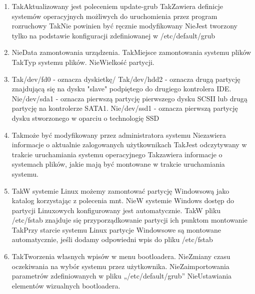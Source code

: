 \begin{enumerate}
	\item {}
	{Tak}{Aktualizowany jest poleceniem update-grub}
	{Tak}{Zawiera definicje systemów operacyjnych możliwych do uruchomienia przez program rozruchowy}
	{Tak}{Nie powinien być ręcznie modyfikowany}
	{Nie}{Jest tworzony tylko na podstawie konfiguracji zdefiniowanej w /etc/default/grub}
	
	\newpage
	
	\item {}
	{Nie}{Data zamontowania urządzenia.}
	{Tak}{Miejsce zamontowania systemu plików}
	{Tak}{Typ systemu plików.}
	{Nie}{Wielkość partycji.}

	\item {}
	{Tak}{/dev/fd0 - oznacza dyskietkę/}
	{Tak}{/dev/hdd2 - oznacza drugą partycję znajdującą się na dysku "slave" podpiętego do drugiego kontrolera IDE.}
	{Nie}{/dev/sda1 - oznacza pierwszą partycję pierwszego dysku SCSII lub drugą partycję na kontrolerze SATA1.}
	{Nie}{/dev/ssd1 - oznacza pierwszą partycję dysku stworzonego w oparciu o technologię SSD}
	
	\item {}
	{Tak}{może być modyfikowany przez administratora systemu}
	{Nie}{zawiera informacje o aktualnie zalogowanych użytkownikach}
	{Tak}{Jest odczytywany w trakcie uruchamiania systemu operacyjnego}
	{Tak}{zawiera informacje o systemach plików, jakie mają być montowane w trakcie uruchamiania systemu.}
	
	\item {}%
	{Tak}{W systemie Linux możemy zamontować partycję Windowsową jako katalog korzystając z polecenia mnt.}%
	{Nie}{W systemie Windows dostęp do partycji Linuxowych konfigurowany jest automatycznie.}%
	{Tak}{W pliku /etc/fstab znajduje się przyporządkowanie partycji ich punktom montowanie}%
	{Tak}{Przy starcie systemu Linux partycje Windowsowe są montowane automatycznie, jeśli dodamy odpowiedni wpis do pliku /etc/fstab}
	
	\item {}%
	{Tak}{Tworzenia własnych wpisów w menu bootloadera.}%
	{Nie}{Zmiany czasu oczekiwania na wybór systemu przez użytkownika.}%
	{Nie}{Zaimportowania parametrów zdefiniowanych w pliku „/etc/default/grub”}%
	{Nie}{Ustawiania elementów wizualnych bootloadera.}


\end{enumerate}

